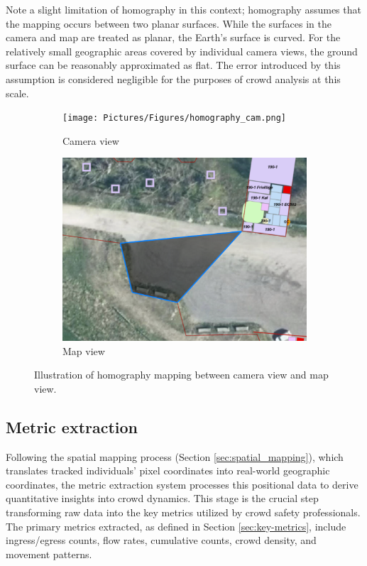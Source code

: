 Note a slight limitation of homography in this context; homography assumes that the mapping occurs between two planar surfaces. While the surfaces in the camera and map are treated as planar, the Earth's surface is curved. For the relatively small geographic areas covered by individual camera views, the ground surface can be reasonably approximated as flat. The error introduced by this assumption is considered negligible for the purposes of crowd analysis at this scale.

\begin{figure}
  \begin{subfigure}{0.46\textwidth}
    \centering
    \texttt{[image: Pictures/Figures/homography\_cam.png]}
    \caption{Camera view}
  \end{subfigure}%
  \hspace{0.06\textwidth}
  \begin{subfigure}{0.46\textwidth}
    \centering
    \includegraphics[width=\textwidth]{Pictures/Figures/homography_map.png}
    \caption{Map view}
  \end{subfigure}
  \caption{Illustration of homography mapping between camera view and map view.}
  \label{fig:homography_mapping}
\end{figure}


\subsection{Metric extraction}
\label{sec:metric_extraction}

Following the spatial mapping process (Section \ref{sec:spatial_mapping}), which translates tracked individuals' pixel coordinates into real-world geographic coordinates, the metric extraction system processes this positional data to derive quantitative insights into crowd dynamics. This stage is the crucial step transforming raw data into the key metrics utilized by crowd safety professionals. The primary metrics extracted, as defined in Section \ref{sec:key-metrics}, include ingress/egress counts, flow rates, cumulative counts, crowd density, and movement patterns.

